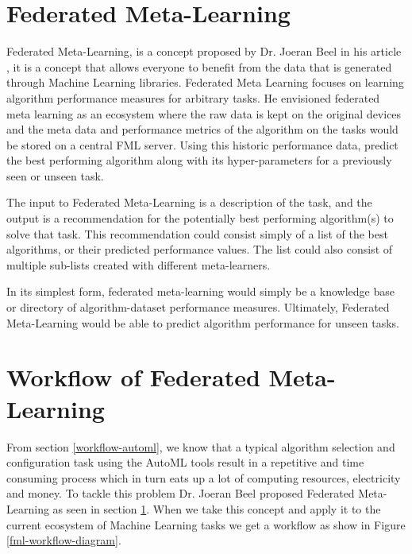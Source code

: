 

\section{Federated Meta-Learning}
\label{federated-meta-learning}
Federated Meta-Learning, is a concept proposed by Dr. Joeran Beel in his article \citep{fml}, it is a concept that allows everyone to benefit from the data that is generated through Machine Learning libraries. Federated Meta Learning focuses on learning algorithm performance measures for arbitrary tasks. He envisioned federated meta learning as an ecosystem where the raw data is kept on the original devices and the meta data and performance metrics of the algorithm on the tasks would be stored on a central FML server. Using this historic performance data, predict the best performing algorithm along with its hyper-parameters for a previously seen or unseen task.

The input to Federated Meta-Learning is a description of the task, and the output is a recommendation for the potentially best performing algorithm(s) to solve that task. This recommendation could consist simply of a list of the best algorithms, or their predicted performance values. The list could also consist of multiple sub-lists created with different meta-learners.

In its simplest form, federated meta-learning would simply be a knowledge base or directory of algorithm-dataset performance measures. Ultimately, Federated Meta-Learning would be able to predict algorithm performance for unseen tasks.

\section{Workflow of Federated Meta-Learning}
\label{fml-workflow}

From section \ref{workflow-automl}, we know that a typical algorithm selection and configuration task using the AutoML tools result in a repetitive and time consuming process which in turn eats up a lot of computing resources, electricity and money. To tackle this problem Dr. Joeran Beel proposed Federated Meta-Learning as seen in section \ref{federated-meta-learning}. When we take this concept and apply it to the current ecosystem of Machine Learning tasks we get a workflow as show in Figure \ref{fml-workflow-diagram}.

